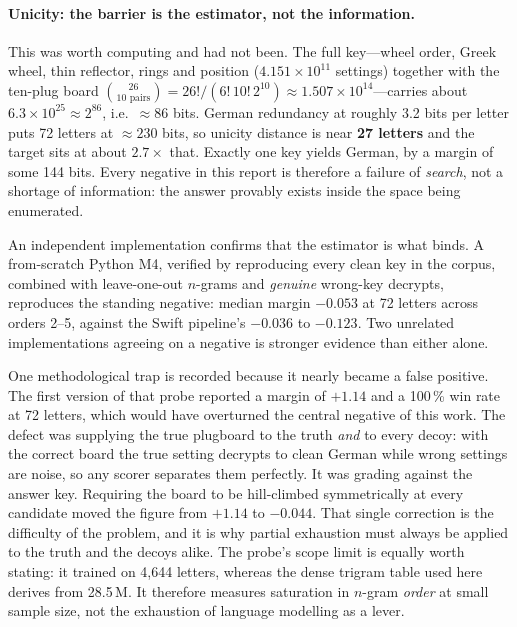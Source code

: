 \documentclass[11pt,a4paper]{article}
\begin{document}
\paragraph{Unicity: the barrier is the estimator, not the information.}
This was worth computing and had not been. The full key---wheel order, Greek wheel, thin
reflector, rings and position ($4.151\times10^{11}$ settings) together with the ten-plug board
$\binom{26}{\text{10 pairs}} = 26!/(6!\,10!\,2^{10}) \approx 1.507\times10^{14}$---carries
about $6.3\times10^{25} \approx 2^{86}$, i.e.\ ${\approx}86$ bits. German redundancy at roughly
3.2 bits per letter puts 72 letters at ${\approx}230$ bits, so unicity distance is near
\textbf{27 letters} and the target sits at about $2.7\times$ that. Exactly one key yields
German, by a margin of some 144 bits. Every negative in this report is therefore a failure of
\emph{search}, not a shortage of information: the answer provably exists inside the space being
enumerated.

An independent implementation confirms that the estimator is what binds. A from-scratch Python
M4, verified by reproducing every clean key in the corpus, combined with leave-one-out
$n$-grams and \emph{genuine} wrong-key decrypts, reproduces the standing negative: median
margin $-0.053$ at 72 letters across orders 2--5, against the Swift pipeline's $-0.036$ to
$-0.123$. Two unrelated implementations agreeing on a negative is stronger evidence than
either alone.

One methodological trap is recorded because it nearly became a false positive. The first
version of that probe reported a margin of $+1.14$ and a 100\,\% win rate at 72 letters, which
would have overturned the central negative of this work. The defect was supplying the true
plugboard to the truth \emph{and} to every decoy: with the correct board the true setting
decrypts to clean German while wrong settings are noise, so any scorer separates them
perfectly. It was grading against the answer key. Requiring the board to be hill-climbed
symmetrically at every candidate moved the figure from $+1.14$ to $-0.044$. That single
correction is the difficulty of the problem, and it is why partial exhaustion must always be
applied to the truth and the decoys alike. The probe's scope limit is equally worth stating:
it trained on 4{,}644 letters, whereas the dense trigram table used here derives from
28.5\,M. It therefore measures saturation in $n$-gram \emph{order} at small sample size, not
the exhaustion of language modelling as a lever.
\end{document}
